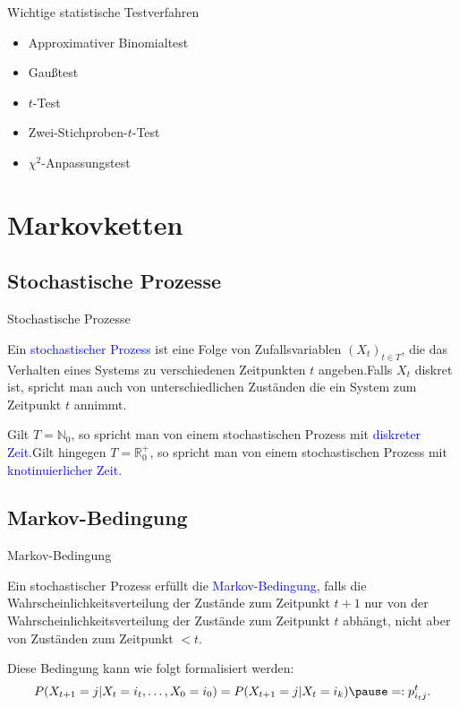 \documentclass{beamer}
\def\spadding{\vspace{0.25cm}}
\def\b{\textcolor{blue}}
\begin{document}
\begin{frame}
    \begin{block}{Wichtige statistische Testverfahren}\pause
        \begin{itemize}
            \item Approximativer Binomialtest\pause
            \item Gaußtest\pause
            \item $t$-Test\pause
            \item Zwei-Stichproben-$t$-Test\pause
            \item $\chi^2$-Anpassungstest
        \end{itemize}
    \end{block}
\end{frame}

\section{Markovketten}
\subsection{Stochastische Prozesse}
\begin{frame}{Stochastische Prozesse}
    \begin{definition}
        Ein \b{stochastischer Prozess} ist eine Folge von Zufallsvariablen $(X_t)_{t \in T}$, die das Verhalten eines Systems zu verschiedenen Zeitpunkten $t$ angeben.\pause Falls $X_t$ diskret ist, spricht man auch von unterschiedlichen Zuständen die ein System zum Zeitpunkt $t$ annimmt.\par\pause\spadding
        Gilt $T = \mathbb{N}_0$, so spricht man von einem stochastischen Prozess mit \b{diskreter Zeit}.\pause Gilt hingegen $T = \mathbb{R}_0^+$, so spricht man von einem stochastischen Prozess mit \b{knotinuierlicher Zeit}.
    \end{definition}
\end{frame}

\subsection{Markov-Bedingung}
\begin{frame}{Markov-Bedingung}
    \begin{definition}
        Ein stochastischer Prozess erfüllt die \b{Markov-Bedingung}, falls die Wahrscheinlichkeitsverteilung der Zustände zum Zeitpunkt $t + 1$ nur von der Wahrscheinlichkeitsverteilung der Zustände zum Zeitpunkt $t$ abhängt, nicht aber von Zuständen zum Zeitpunkt $< t$.\pause\par\spadding
        Diese Bedingung kann wie folgt formalisiert werden:
        \begin{align*}
            P(X_{t+1} = j | X_t = i_t, \dots, X_0 = i_0) = P(X_{t+1} = j | X_t = i_k)\pause =: p_{i_t j}^t.
        \end{align*}
    \end{definition}
\end{frame}
\end{document}

